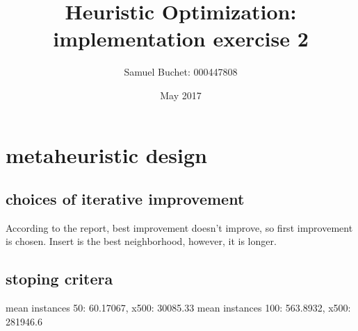 \documentclass{article}
\title{Heuristic Optimization: implementation exercise 2}
\author{Samuel Buchet: 000447808}
\date{May 2017}
\begin{document}
\maketitle

\section{metaheuristic design}

\subsection{choices of iterative improvement}

According to the report, best improvement doesn't improve, so first improvement is chosen.
Insert is the best neighborhood, however, it is longer.

\subsection{stoping critera}

mean instances 50: 60.17067, x500: 30085.33\newline
mean instances 100: 563.8932, x500: 281946.6
\end{document}
